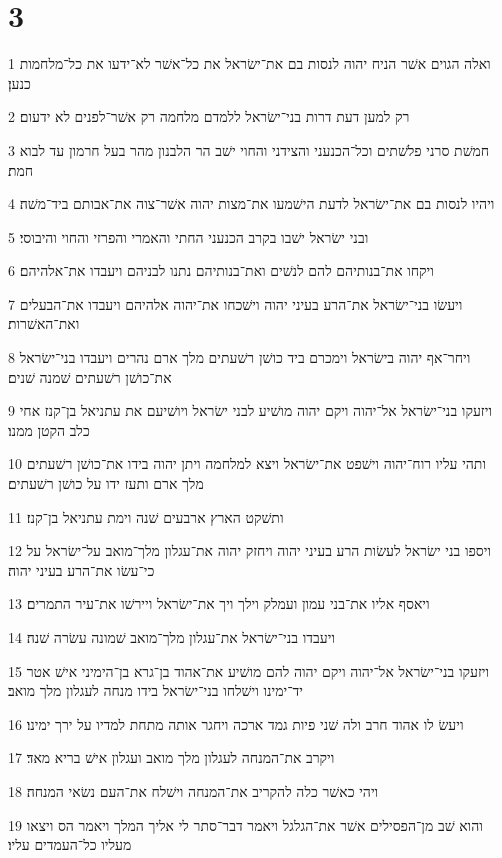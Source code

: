 \chapter{3}

\par 1 ואלה הגוים אשׁר הניח יהוה לנסות בם את־ישׂראל את כל־אשׁר לא־ידעו את כל־מלחמות כנען׃
\par 2 רק למען דעת דרות בני־ישׂראל ללמדם מלחמה רק אשׁר־לפנים לא ידעום׃
\par 3 חמשׁת סרני פלשׁתים וכל־הכנעני והצידני והחוי ישׁב הר הלבנון מהר בעל חרמון עד לבוא חמת׃
\par 4 ויהיו לנסות בם את־ישׂראל לדעת הישׁמעו את־מצות יהוה אשׁר־צוה את־אבותם ביד־משׁה׃
\par 5 ובני ישׂראל ישׁבו בקרב הכנעני החתי והאמרי והפרזי והחוי והיבוסי׃
\par 6 ויקחו את־בנותיהם להם לנשׁים ואת־בנותיהם נתנו לבניהם ויעבדו את־אלהיהם׃
\par 7 ויעשׂו בני־ישׂראל את־הרע בעיני יהוה וישׁכחו את־יהוה אלהיהם ויעבדו את־הבעלים ואת־האשׁרות׃
\par 8 ויחר־אף יהוה בישׂראל וימכרם ביד כושׁן רשׁעתים מלך ארם נהרים ויעבדו בני־ישׂראל את־כושׁן רשׁעתים שׁמנה שׁנים׃
\par 9 ויזעקו בני־ישׂראל אל־יהוה ויקם יהוה מושׁיע לבני ישׂראל ויושׁיעם את עתניאל בן־קנז אחי כלב הקטן ממנו׃
\par 10 ותהי עליו רוח־יהוה וישׁפט את־ישׂראל ויצא למלחמה ויתן יהוה בידו את־כושׁן רשׁעתים מלך ארם ותעז ידו על כושׁן רשׁעתים׃
\par 11 ותשׁקט הארץ ארבעים שׁנה וימת עתניאל בן־קנז׃
\par 12 ויספו בני ישׂראל לעשׂות הרע בעיני יהוה ויחזק יהוה את־עגלון מלך־מואב על־ישׂראל על כי־עשׂו את־הרע בעיני יהוה׃
\par 13 ויאסף אליו את־בני עמון ועמלק וילך ויך את־ישׂראל ויירשׁו את־עיר התמרים׃
\par 14 ויעבדו בני־ישׂראל את־עגלון מלך־מואב שׁמונה עשׂרה שׁנה׃
\par 15 ויזעקו בני־ישׂראל אל־יהוה ויקם יהוה להם מושׁיע את־אהוד בן־גרא בן־הימיני אישׁ אטר יד־ימינו וישׁלחו בני־ישׂראל בידו מנחה לעגלון מלך מואב׃
\par 16 ויעשׂ לו אהוד חרב ולה שׁני פיות גמד ארכה ויחגר אותה מתחת למדיו על ירך ימינו׃
\par 17 ויקרב את־המנחה לעגלון מלך מואב ועגלון אישׁ בריא מאד׃
\par 18 ויהי כאשׁר כלה להקריב את־המנחה וישׁלח את־העם נשׂאי המנחה׃
\par 19 והוא שׁב מן־הפסילים אשׁר את־הגלגל ויאמר דבר־סתר לי אליך המלך ויאמר הס ויצאו מעליו כל־העמדים עליו׃
